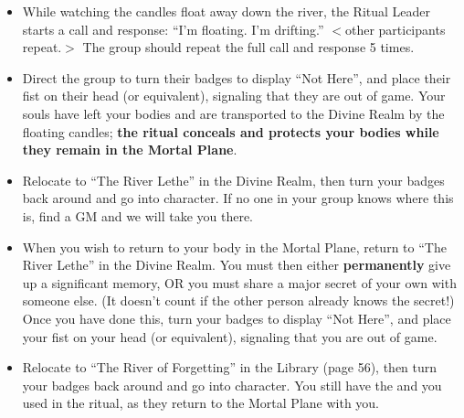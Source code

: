 \documentclass[green]{GL2020}
\begin{document}
\begin{enumerate}
\begin{itemize}
        \item While watching the candles float away down the river, the Ritual Leader starts a call and response: ``I'm floating. I'm drifting.'' $<$other participants repeat.$>$ The group should repeat the full call and response 5 times.
        \item Direct the group to turn their badges to display ``Not Here'', and place their fist on their head (or equivalent), signaling that they are out of game. Your souls have left your bodies and are transported to the Divine Realm by the floating candles; \textbf{the ritual conceals and protects your bodies while they remain in the Mortal Plane}.
        \item Relocate to ``The River Lethe'' in the Divine Realm, then turn your badges back around and go into character. If no one in your group knows where this is, find a GM and we will take you there.
        \item When you wish to return to your body in the Mortal Plane, return to ``The River Lethe'' in the Divine Realm. You must then either \textbf{permanently} give up a significant memory, OR you must share a major secret of your own with someone else. (It doesn't count if the other person already knows the secret!) Once you have done this, turn your badges to display ``Not Here'', and place your fist on your head (or equivalent), signaling that you are out of game. 
       \item Relocate to ``The River of Forgetting'' in the Library (page 56), then turn your badges back around and go into character. You still have the \iRitualCandle{} and \iGlassVial{} you used in the ritual, as they return to the Mortal Plane with you.
    \end{itemize}
\end{enumerate}
\end{document}
